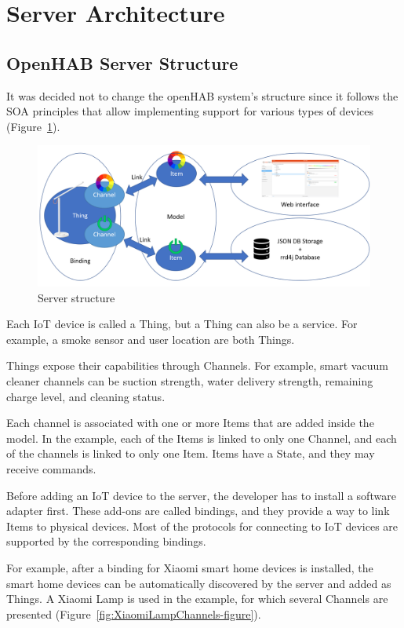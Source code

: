 \section{Server Architecture}
\subsection{OpenHAB Server Structure}

It was decided not to change the openHAB system's structure since it follows the SOA principles that allow implementing support for various types of devices (Figure~\ref{fig:openHABServerStructure-figure}).

\begin{figure}
  \centering
  \includegraphics[width=0.9\linewidth]{figures/openHABServerStructure.png}
  \caption{Server structure}
  \label{fig:openHABServerStructure-figure}
\end{figure}

Each IoT device is called a Thing, but a Thing can also be a  service. For example, a smoke sensor and user location are both Things.

Things expose their capabilities through Channels. For example, smart vacuum cleaner channels can be suction strength, water delivery strength, remaining charge level, and cleaning status.

Each channel is associated with one or more Items that are added inside the model. In the example, each of the Items is linked to only one Channel, and each of the channels is linked to only one Item. Items have a State, and they may receive commands. 

Before adding an IoT device to the server, the developer has to install a software adapter first. These add-ons are called bindings, and they provide a way to link Items to physical devices. Most of the protocols for connecting to IoT devices are supported by the corresponding bindings.

For example, after a binding for Xiaomi smart home devices is installed, the smart home devices can be automatically discovered by the server and added as Things. A Xiaomi Lamp is used in the example, for which several Channels are presented (Figure~\ref{fig:XiaomiLampChannels-figure}).

